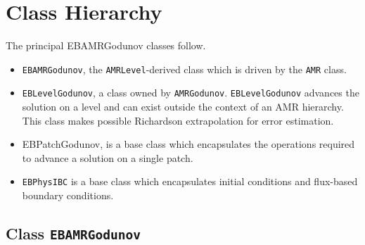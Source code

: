 
\section{Class Hierarchy}

The principal EBAMRGodunov classes follow.

\begin{itemize}
\item {\tt EBAMRGodunov}, the {\tt AMRLevel}-derived class
        which is driven by the {\tt AMR} class. 
\item {\tt EBLevelGodunov}, a class owned by {\tt AMRGodunov}.
        {\tt EBLevelGodunov} advances the solution on a level
        and can exist outside the context of an AMR hierarchy.
        This class makes possible 
        Richardson extrapolation for error estimation.
\item{EBPatchGodunov}, is a base class which encapsulates the 
        operations required to advance a solution on a single
        patch. 
\item {\tt EBPhysIBC} is a base class which encapsulates 
        initial conditions and 
        flux-based boundary conditions.
\end{itemize}

\subsection{Class {\tt EBAMRGodunov} }

